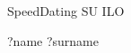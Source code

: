 

\begin{minipage}[c]{\textwidth}
  \hline

  \hspace{0.5cm}

  SpeedDating SU ILO

  ?name ?surname

  \hspace{0.5cm}

  \hline
\end{minipage}
